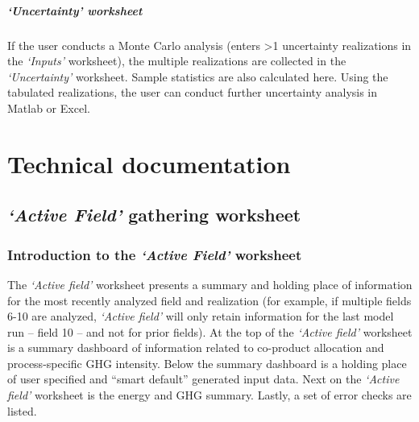 \documentclass[11pt]{report}
\newcommand{\sheet}[1]{\textit{`{#1}'}}
\begin{document}
\subsubsection{\sheet{Uncertainty} worksheet} 

If the user conducts a Monte Carlo analysis (enters >1 uncertainty realizations in the \sheet{Inputs} worksheet), the multiple realizations are collected in the \sheet{Uncertainty} worksheet. Sample statistics are also calculated here. Using the tabulated realizations, the user can conduct further uncertainty analysis in Matlab or Excel.

\clearpage



\part{Technical documentation}







\chapter{\sheet{Active Field} gathering worksheet}
\label{sec:active_field}


\clearpage

\section{Introduction to the \sheet{Active Field} worksheet}

The \sheet{Active field} worksheet presents a summary and holding place of information for the most recently analyzed field and realization (for example, if multiple fields 6-10 are analyzed, \sheet{Active field} will only retain information for the last model run -- field 10 -- and not for prior fields). At the top of the \sheet{Active field} worksheet is a summary dashboard of information related to co-product allocation and process-specific GHG intensity. Below the summary dashboard is a holding place of user specified and ``smart default'' generated input data. Next on the \sheet{Active field} worksheet is the energy and GHG summary. Lastly, a set of error checks are listed.
\end{document}
